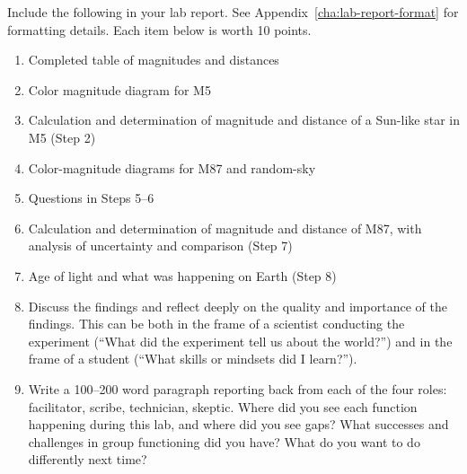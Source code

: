 Include the following in your lab report. See Appendix~\ref{cha:lab-report-format} for formatting details. Each item below is worth 10 points.

\begin{enumerate}
	\item Completed table of magnitudes and distances
	
	\item Color magnitude diagram for M5
	
	\item Calculation and determination of magnitude and distance of a Sun-like star in M5 (Step 2)

	\item Color-magnitude diagrams for M87 and random-sky
	
	\item Questions in Steps 5--6
	
	\item Calculation and determination of magnitude and distance of M87, with analysis of uncertainty and comparison (Step 7)
	
	\item Age of light and what was happening on Earth (Step 8)
	
	\item Discuss the findings and reflect deeply on the quality and importance of the findings. This can
	be both in the frame of a scientist conducting the experiment (“What did the experiment tell us
	about the world?”) and in the frame of a student (“What skills or mindsets did I learn?”).
	
	\item Write a 100--200 word paragraph reporting back from each of the four roles: facilitator, scribe, technician, skeptic. Where did you see each function happening during this lab, and where did you see gaps? What successes and challenges in group functioning did you have? What do you want to do differently next time?
		
\end{enumerate}
